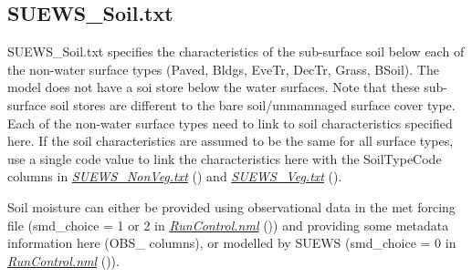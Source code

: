 \documentclass[letterpaper,10pt,english]{sphinxmanual}
\begin{document}
\subsection{SUEWS\_Soil.txt}
\label{\detokenize{input_files/SUEWS_SiteInfo/SUEWS_Soil:suews-soil-txt}}\label{\detokenize{input_files/SUEWS_SiteInfo/SUEWS_Soil::doc}}
SUEWS\_Soil.txt specifies the characteristics of the sub-surface soil
below each of the non-water surface types (Paved, Bldgs, EveTr, DecTr,
Grass, BSoil). The model does not have a soi store below the water
surfaces. Note that these sub-surface soil stores are different to the
bare soil/unmamnaged surface cover type. Each of the non-water surface
types need to link to soil characteristics specified here. If the soil
characteristics are assumed to be the same for all surface types, use a
single code value to link the characteristics here with the SoilTypeCode
columns in {\hyperref[\detokenize{input_files/SUEWS_SiteInfo/SUEWS_Soil:SUEWS_NonVeg.txt}]{\emph{SUEWS\_NonVeg.txt}}} () and
{\hyperref[\detokenize{input_files/SUEWS_SiteInfo/SUEWS_Soil:SUEWS_Veg.txt}]{\emph{SUEWS\_Veg.txt}}} ().

Soil moisture can either be provided using observational data in the met
forcing file (smd\_choice = 1 or 2 in
{\hyperref[\detokenize{input_files/SUEWS_SiteInfo/SUEWS_Soil:RunControl.nml}]{\emph{RunControl.nml}}} ()) and providing some metadata
information here (OBS\_ columns), or modelled by SUEWS (smd\_choice = 0
in {\hyperref[\detokenize{input_files/SUEWS_SiteInfo/SUEWS_Soil:RunControl.nml}]{\emph{RunControl.nml}}} ()). 
\end{document}
